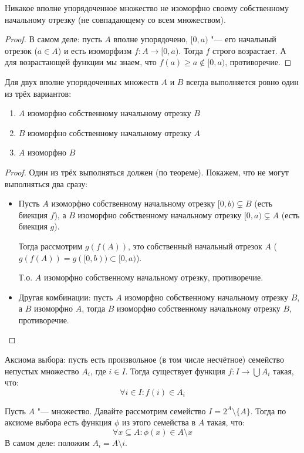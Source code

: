 \begin{lemma}
	Никакое вполне упорядоченное множество не изоморфно своему собственному начальному отрезку (не совпадающему со всем множеством).
\end{lemma}
\begin{proof}
	В самом деле: пусть $A$ вполне упорядочено, $[0, a)$ "--- его начальный отрезок ($a \in A$)
	и есть изоморфизм $f \colon A \to [0, a)$.
	Тогда $f$ строго возрастает.
	А для возрастающей функции мы знаем, что $f(a) \ge a \notin [0, a)$, противоречие.
\end{proof}
\begin{conseq}
	Для двух вполне упорядоченных множеств $A$ и $B$ всегда выполняется ровно один из трёх вариантов:
	\begin{enumerate}
		\item $A$ изоморфно собственному начальному отрезку $B$
		\item $B$ изоморфно собственному начальному отрезку $A$
		\item $A$ изоморфно $B$
	\end{enumerate}
\end{conseq}
\begin{proof}
	Один из трёх выполняться должен (по теореме).
	Покажем, что не могут выполняться два сразу:
	\begin{itemize}
		\item
			Пусть $A$ изоморфно собственному начальному отрезку $[0, b) \subsetneq B$ (есть биекция $f$),
			а $B$ изоморфно собственному начальному отрезку $[0, a) \subsetneq A$ (есть биекция $g$).

			Тогда рассмотрим $g(f(A))$, это собственный начальный отрезок $A$
			($g(f(A)) = g([0, b)) \subset [0, a)$).

			Т.о. $A$ изоморфно собственному начальному отрезку, противоречие.

		\item
			Другая комбинации: пусть $A$ изоморфно собственному начальному отрезку $B$,
			а $B$ изоморфно $A$, тогда $B$ изоморфно собственному начальному отрезку $B$,
			противоречие.
	\end{itemize}
\end{proof}

\begin{Def}
	Аксиома выбора: пусть есть произвольное (в том числе несчётное) семейство
	непустых множество $A_i$, где $i \in I$.
	Тогда существует функция $f \colon I \to \bigcup A_i$ такая, что:
	\[ \forall i \in I \colon f(i) \in A_i \]
\end{Def}
\begin{conseq}\label{axiom_of_choice_phi}
	Пусть $A$ "--- множество.
	Давайте рассмотрим семейство $I=2^A \setminus \{A \}$.
	Тогда по аксиоме выбора есть функция $\phi$ из этого семейства в $A$ такая, что:
	\[ \forall x \subseteq A \colon \phi(x) \in A \setminus x \]
	В самом деле: положим $A_i = A \setminus i$.
\end{conseq}

